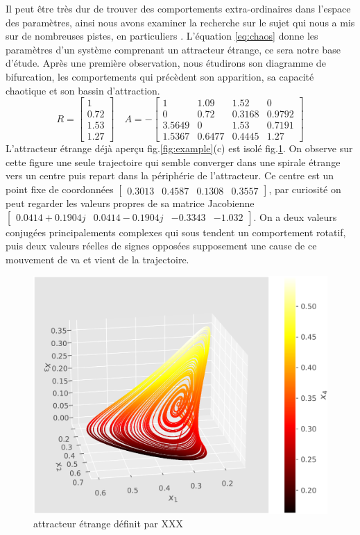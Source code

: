 \documentclass{wsdcr}
\begin{document}
Il peut être très dur de trouver des comportements extra-ordinaires dans l'espace des paramètres, ainsi nous avons examiner la recherche sur le sujet qui nous a mis sur de nombreuses pistes, en particuliers \cite{vano2006}. L'équation \ref{eq:chaos} donne les paramètres d'un système comprenant un attracteur étrange, ce sera notre base d'étude. Après une première observation, nous étudirons son diagramme de bifurcation, les comportements qui précèdent son apparition, sa capacité chaotique et son bassin d'attraction. 
\begin{equation}
R={\begin{bmatrix}1\\0.72\\1.53\\1.27\end{bmatrix}}\quad A =-{\begin{bmatrix}1&1.09&1.52&0\\0&0.72&0.3168&0.9792\\3.5649&0&1.53&0.7191\\1.5367&0.6477&0.4445&1.27\end{bmatrix}}
\label{eq:chaos}
\end{equation}
L'attracteur étrange déjà aperçu fig.\ref{fig:example}(c) est isolé fig.\ref{fig:ae4}. On observe sur cette figure une seule trajectoire qui semble converger dans une spirale étrange vers un centre puis repart dans la périphérie de l'attracteur. Ce centre est un point fixe de coordonnées $\begin{bmatrix}0.3013&0.4587&0.1308&0.3557\end{bmatrix}$, par curiosité on peut regarder les valeurs propres de sa matrice Jacobienne $\begin{bmatrix}0.0414+0.1904j&0.0414-0.1904j&-0.3343&-1.032\end{bmatrix}$. On a deux valeurs conjugées principalements complexes qui sous tendent un comportement rotatif, puis deux valeurs réelles de signes opposées supposement une cause de ce mouvement de va et vient de la trajectoire. 
\begin{figure}
    \centering
    \includegraphics[width=\linewidth]{fig/lv4_ae4.png}
    \caption{attracteur étrange définit par XXX}
    \label{fig:ae4}
\end{figure}
\end{document}

